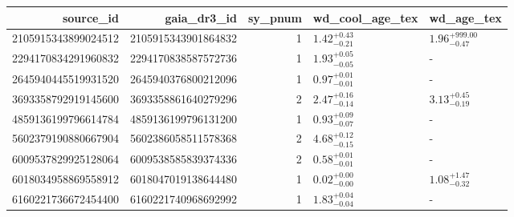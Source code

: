\begin{tabular}{rrrll}
\toprule
source_id & gaia_dr3_id & sy_pnum & wd_cool_age_tex & wd_age_tex \\
\midrule
2105915343899024512 & 2105915343901864832 & 1 & $1.42^{+0.43}_{-0.21}$ & $1.96^{+999.00}_{-0.47}$ \\
2294170834291960832 & 2294170838587572736 & 1 & $1.93^{+0.05}_{-0.05}$ & - \\
2645940445519931520 & 2645940376800212096 & 1 & $0.97^{+0.01}_{-0.01}$ & - \\
3693358792919145600 & 3693358861640279296 & 2 & $2.47^{+0.16}_{-0.14}$ & $3.13^{+0.45}_{-0.19}$ \\
4859136199796614784 & 4859136199796131200 & 1 & $0.93^{+0.09}_{-0.07}$ & - \\
5602379190880667904 & 5602386058511578368 & 2 & $4.68^{+0.12}_{-0.15}$ & - \\
6009537829925128064 & 6009538585839374336 & 2 & $0.58^{+0.01}_{-0.01}$ & - \\
6018034958869558912 & 6018047019138644480 & 1 & $0.02^{+0.00}_{-0.00}$ & $1.08^{+1.47}_{-0.32}$ \\
6160221736672454400 & 6160221740968692992 & 1 & $1.83^{+0.04}_{-0.04}$ & - \\
\bottomrule
\end{tabular}
